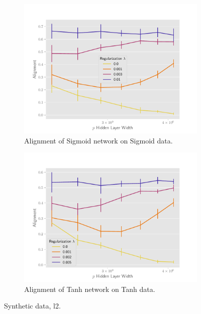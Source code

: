 \begin{figure}[h]
\medskip

\begin{subfigure}[b]{.49\textwidth}
  \centering
  \includegraphics[width=\linewidth]{figures/align_nn_sigmoid_autograd_l2_v4.pdf}
  \caption{Alignment of Sigmoid network on Sigmoid data.}
  \label{fig:align_nn_sigmoid_autograd_l2}
\end{subfigure}\hfill
\begin{subfigure}[b]{.49\textwidth}
  \centering
  \includegraphics[width=\linewidth]{figures/align_nn_tanh_autograd_l2_v4.pdf}
  \caption{Alignment of Tanh network on Tanh data.}
  \label{fig:align_nn_tanh_autograd_l2}
\end{subfigure}
\caption{Synthetic data, l2. }
\label{fig:synthetic-l2}
\end{figure}


